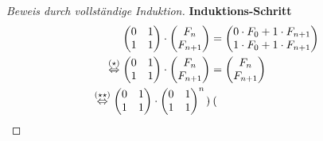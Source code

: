 \documentclass[a4paper]{scrartcl}
\begin{document}
\begin{enumerate}[(a)]
\begin{proof}[Beweis durch vollständige Induktion]
            \textbf{Induktions-Schritt} \\
            \begin{equation}
                \begin{split}
                    \begin{pmatrix}
                        0 & 1 \\
                        1 & 1
                    \end{pmatrix}
                    \cdot
                    \begin{pmatrix}
                        F_n \\ F_{n+1}
                    \end{pmatrix}
                    &=
                    \begin{pmatrix}
                        0 \cdot F_0 + 1 \cdot F_{n+1} \\
                        1 \cdot F_0 + 1 \cdot F_{n+1} \\
                    \end{pmatrix} \\
                    \stackrel{(\star)}{\Leftrightarrow}
                    \begin{pmatrix}
                        0 & 1 \\
                        1 & 1
                    \end{pmatrix}
                    \cdot
                    \begin{pmatrix}
                        F_n \\ F_{n+1}
                    \end{pmatrix}
                    &=
                    \begin{pmatrix}
                        F_n \\ F_{n+1}
                    \end{pmatrix} \\
                    \stackrel{(\star\star)}{\Leftrightarrow}
                    \begin{pmatrix}
                        0 & 1 \\
                        1 & 1
                    \end{pmatrix}
                    \cdot
                    \begin{pmatrix}
                        0 & 1 \\
                        1 & 1
                    \end{pmatrix}^n
                    \cdot
                    \begin{pmatrix}

\end{pmatrix}
\end{split}
\end{equation}
\end{proof}
\end{enumerate}
\end{document}
